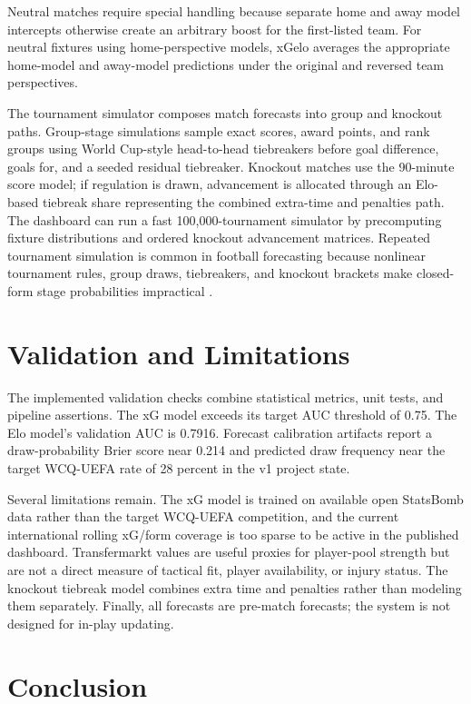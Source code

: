 \documentclass[11pt]{article}
\begin{document}
Neutral matches require special handling because separate home and away model
intercepts otherwise create an arbitrary boost for the first-listed team. For
neutral fixtures using home-perspective models, xGelo averages the appropriate
home-model and away-model predictions under the original and reversed team
perspectives.

The tournament simulator composes match forecasts into group and knockout paths.
Group-stage simulations sample exact scores, award points, and rank groups using
World Cup-style head-to-head tiebreakers before goal difference, goals for, and
a seeded residual tiebreaker. Knockout matches use the 90-minute score model;
if regulation is drawn, advancement is allocated through an Elo-based tiebreak
share representing the combined extra-time and penalties path. The dashboard can
run a fast 100,000-tournament simulator by precomputing fixture distributions
and ordered knockout advancement matrices. Repeated tournament simulation is
common in football forecasting because nonlinear tournament rules, group draws,
tiebreakers, and knockout brackets make closed-form stage probabilities
impractical \cite{kuonen1996,gilchmuller2018,groll2018rf,groll2021euro2020}.

\section{Validation and Limitations}

The implemented validation checks combine statistical metrics, unit tests, and
pipeline assertions. The xG model exceeds its target AUC threshold of 0.75. The
Elo model's validation AUC is 0.7916. Forecast calibration artifacts report a
draw-probability Brier score near 0.214 and predicted draw frequency near the
target WCQ-UEFA rate of 28 percent in the v1 project state.

Several limitations remain. The xG model is trained on available open
StatsBomb data rather than the target WCQ-UEFA competition, and the current
international rolling xG/form coverage is too sparse to be active in the
published dashboard. Transfermarkt values are useful proxies for player-pool
strength but are not a direct measure of tactical fit, player availability, or
injury status. The knockout tiebreak model combines extra time and penalties
rather than modeling them separately. Finally, all forecasts are pre-match
forecasts; the system is not designed for in-play updating.

\section{Conclusion}
\end{document}
